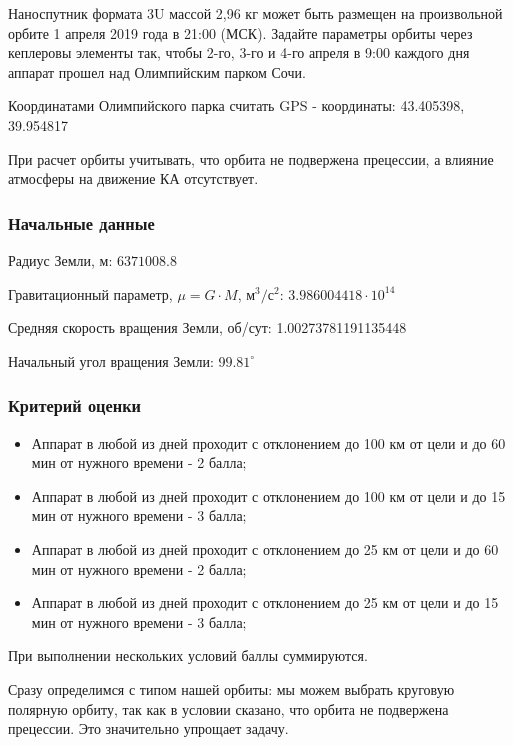 
Наноспутник формата 3U массой 2,96 кг может быть размещен на произвольной орбите 1 апреля 2019 года в 21:00 (МСК). Задайте параметры орбиты через кеплеровы элементы так, чтобы 2-го, 3-го и 4-го апреля в 9:00 каждого дня аппарат прошел над Олимпийским парком Сочи.

Координатами Олимпийского парка считать GPS - координаты: 43.405398, 39.954817

При расчет орбиты учитывать, что орбита не подвержена прецессии, а влияние атмосферы на движение КА отсутствует.

\subsubsection*{Начальные данные}

Радиус Земли, м: $6371008.8$

Гравитационный параметр, $\mu = G \cdot M$, м$^3/$с$^2$: $3.986004418 \cdot 10^{14}$

Средняя скорость вращения Земли, об/сут: 1.00273781191135448

Начальный угол вращения Земли: 9$9.81^{\circ}$

\subsubsection*{Критерий оценки}

\begin{itemize}
    \item Аппарат в любой из дней проходит с отклонением до 100 км от цели и до 60 мин от нужного времени - 2 балла;
    \item Аппарат в любой из дней проходит с отклонением до 100 км от цели и до 15 мин от нужного времени - 3 балла;
    \item Аппарат в любой из дней проходит с отклонением до 25 км от цели и до 60 мин от нужного времени - 2 балла;
    \item Аппарат в любой из дней проходит с отклонением до 25 км от цели и до 15 мин от нужного времени - 3 балла;
\end{itemize}

При выполнении нескольких условий баллы суммируются.

\solutionSection

Сразу определимся с типом нашей орбиты: мы можем выбрать круговую полярную орбиту, так как в условии сказано, что орбита не подвержена прецессии. Это значительно упрощает задачу. 


